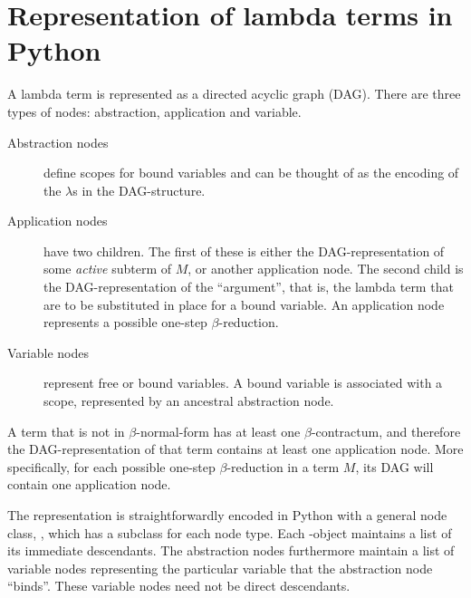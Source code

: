 
\chapter{Representation of lambda terms in Python}

A lambda term is represented as a directed acyclic graph (DAG). There are
three types of nodes: abstraction, application and variable.
\begin{description}
	\item[Abstraction nodes] define scopes for bound variables and can be thought
	of as the encoding of the $\lambda$s in the DAG-structure.
	
	\item[Application nodes] have two children. The first of these
	is either the DAG-representation of some \emph{active} subterm of 
	$M$, or another application node. The second child is the DAG-representation
	of the ``argument'', that is, the lambda term that are to be substituted
	in place for a bound variable. An application node represents a possible
	one-step $\beta$-reduction.
	
	\item[Variable nodes] represent free or bound variables. A bound 
	variable is associated with a scope, represented by an ancestral
	abstraction node.
\end{description}
A term that is not in $\beta$-normal-form has at least one $\beta$-contractum,
and therefore the DAG-representation of that term contains at least one
application node. More specifically, for each possible one-step
$\beta$-reduction in a term $M$, its DAG will contain one application node.

The representation is straightforwardly encoded in Python with a general node
class, , which has a subclass for each node type. Each
-object maintains a list of its immediate descendants. The
abstraction nodes furthermore maintain a list of variable nodes representing
the particular variable that the abstraction node ``binds''. These variable
nodes need not be direct descendants.








